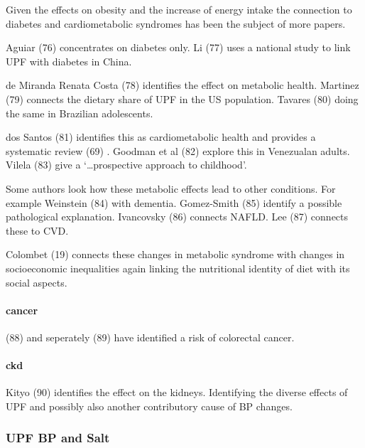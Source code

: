 \documentclass[
]{article}
\begin{document}
Given the effects on obesity and the increase of energy intake the
connection to diabetes and cardiometabolic syndromes has been the
subject of more papers.

Aguiar (76) concentrates on diabetes only. Li (77) uses a national study
to link UPF with diabetes in China.

de Miranda Renata Costa (78) identifies the effect on metabolic health.
Martinez (79) connects the dietary share of UPF in the US population.
Tavares (80) doing the same in Brazilian adolescents.

dos Santos (81) identifies this as cardiometabolic health and provides a
systematic review (69) . Goodman et al (82) explore this in Venezualan
adults. Vilela (83) give a `\ldots prospective approach to childhood'.

Some authors look how these metabolic effects lead to other conditions.
For example Weinstein (84) with dementia. Gomez-Smith (85) identify a
possible pathological explanation. Ivancovsky (86) connects NAFLD. Lee
(87) connects these to CVD.

Colombet (19) connects these changes in metabolic syndrome with changes
in socioeconomic inequalities again linking the nutritional identity of
diet with its social aspects.

\hypertarget{cancer}{%
\paragraph{cancer}\label{cancer}}

(88) and seperately (89) have identified a risk of colorectal cancer.

\hypertarget{ckd}{%
\paragraph{ckd}\label{ckd}}

Kityo (90) identifies the effect on the kidneys. Identifying the diverse
effects of UPF and possibly also another contributory cause of BP
changes.

\hypertarget{upf-bp-and-salt}{%
\subsubsection{UPF BP and Salt}\label{upf-bp-and-salt}}
\end{document}
